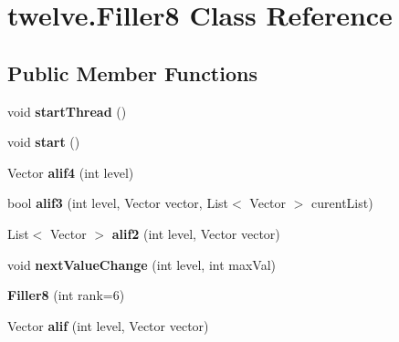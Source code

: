 \hypertarget{classtwelve_1_1_filler8}{}\section{twelve.\+Filler8 Class Reference}
\label{classtwelve_1_1_filler8}
\subsection*{Public Member Functions}
\begin{DoxyCompactItemize}
\item 
\hypertarget{classtwelve_1_1_filler8_afa00fafedcec7e3e3c24f2084d8c39c1}{}void {\bfseries start\+Thread} ()\label{classtwelve_1_1_filler8_afa00fafedcec7e3e3c24f2084d8c39c1}

\item 
\hypertarget{classtwelve_1_1_filler8_a3ffb400ad0b5b5acd92c0d8d8d0adb0a}{}void {\bfseries start} ()\label{classtwelve_1_1_filler8_a3ffb400ad0b5b5acd92c0d8d8d0adb0a}

\item 
\hypertarget{classtwelve_1_1_filler8_ad56779b1cfc62ee4e21fc4fe71e9413a}{}Vector {\bfseries alif4} (int level)\label{classtwelve_1_1_filler8_ad56779b1cfc62ee4e21fc4fe71e9413a}

\item 
\hypertarget{classtwelve_1_1_filler8_ab7ae4653955c88d01c681f5947e6b249}{}bool {\bfseries alif3} (int level, Vector vector, List$<$ Vector $>$ curent\+List)\label{classtwelve_1_1_filler8_ab7ae4653955c88d01c681f5947e6b249}

\item 
\hypertarget{classtwelve_1_1_filler8_ad9cfdd7c8b2867cb73f8d9bd35fe6a30}{}List$<$ Vector $>$ {\bfseries alif2} (int level, Vector vector)\label{classtwelve_1_1_filler8_ad9cfdd7c8b2867cb73f8d9bd35fe6a30}

\item 
\hypertarget{classtwelve_1_1_filler8_a8e1de8fd5a97bd699600e4bdc9657827}{}void {\bfseries next\+Value\+Change} (int level, int max\+Val)\label{classtwelve_1_1_filler8_a8e1de8fd5a97bd699600e4bdc9657827}

\item 
\hypertarget{classtwelve_1_1_filler8_af6b07772e86e71e5e0d8b3b92ed9d7b7}{}{\bfseries Filler8} (int rank=6)\label{classtwelve_1_1_filler8_af6b07772e86e71e5e0d8b3b92ed9d7b7}

\item 
\hypertarget{classtwelve_1_1_filler8_af0009a742fc32727adf7dfca1e5a834e}{}Vector {\bfseries alif} (int level, Vector vector)\label{classtwelve_1_1_filler8_af0009a742fc32727adf7dfca1e5a834e}


\end{DoxyCompactItemize}
